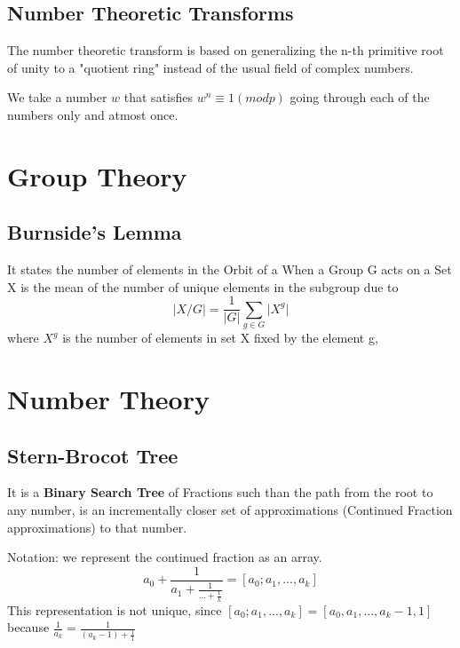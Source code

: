\subsection{Number Theoretic Transforms}

The number theoretic transform is based on generalizing the n-th primitive root of unity to a "quotient ring" instead of the usual field of complex numbers.

We take a number $w$ that satisfies $w^n \equiv 1 (mod p)$ going through each of the numbers only and atmost once.


\section{Group Theory}


\subsection{Burnside's Lemma}

It states the number of elements in the Orbit of a When a Group G acts on a Set X is the mean of the number of unique elements in the subgroup due to
\begin{equation}
  \vert X / G \vert = \frac{1}{\vert G \vert} \sum_{g \in G} \vert X^g \vert
\end{equation}
where $X^g$ is the number of elements in set X fixed by the element g,



\section{Number Theory}


\subsection{Stern-Brocot Tree}

It is a \textbf{Binary Search Tree} of Fractions such than the path from the root to any number, is an incrementally closer set of approximations (Continued Fraction approximations) to that number.

Notation: we represent the continued fraction as an array.
\begin{equation*}
  a_0 + \frac{1}{a_1 + \frac{1}{... + \frac{1}{k}}} = [a_0; a_1, ..., a_k]
\end{equation*}
This representation is not unique, since
$[a_0; a_1, ..., a_k] = [a_0, a_1, ..., a_k - 1, 1]$ because $\frac{1}{a_k} = \frac{1}{(a_k-1) + \frac{1}{1}}$

